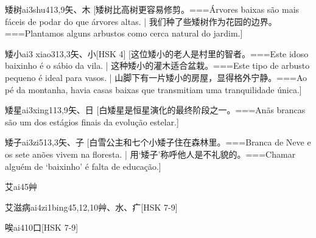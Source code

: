 \begin{EntryWithPhonetic}{矮树}{ai3shu4}{13,9}{⽮、⽊}
  [矮树比高树更容易修剪。===Árvores baixas são mais fáceis de podar do que árvores altas. | 我们种了些矮树作为花园的边界。===Plantamos alguns arbustos como cerca natural do jardim.]
\end{EntryWithPhonetic}

\begin{EntryWithPhonetic}{矮小}{ai3 xiao3}{13,3}{⽮、⼩}[HSK 4]
  [这位矮小的老人是村里的智者。===Este idoso baixinho é o sábio da vila. | 这种矮小的灌木适合盆栽。===Este tipo de arbusto pequeno é ideal para vasos. | 山脚下有一片矮小的房屋，显得格外宁静。===Ao pé da montanha, havia casas baixas que transmitiam uma tranquilidade única.]
\end{EntryWithPhonetic}

\begin{EntryWithPhonetic}{矮星}{ai3xing1}{13,9}{⽮、⽇}
  [白矮星是恒星演化的最终阶段之一。===Anãs brancas são um dos estágios finais da evolução estelar.]
\end{EntryWithPhonetic}

\begin{EntryWithPhonetic}{矮子}{ai3zi5}{13,3}{⽮、⼦}
  [白雪公主和七个小矮子住在森林里。===Branca de Neve e os sete anões vivem na floresta. | 用`矮子'称呼他人是不礼貌的。===Chamar alguém de `baixinho' é falta de educação.]
\end{EntryWithPhonetic}

\begin{EntryWithPhonetic}{艾}{ai4}{5}{⾋}
\end{EntryWithPhonetic}

\begin{EntryWithPhonetic}{艾滋病}{ai4zi1bing4}{5,12,10}{⾋、⽔、⽧}[HSK 7-9]
\end{EntryWithPhonetic}

\begin{EntryWithPhonetic}{唉}{ai4}{10}{⼝}[HSK 7-9]
\end{EntryWithPhonetic}

